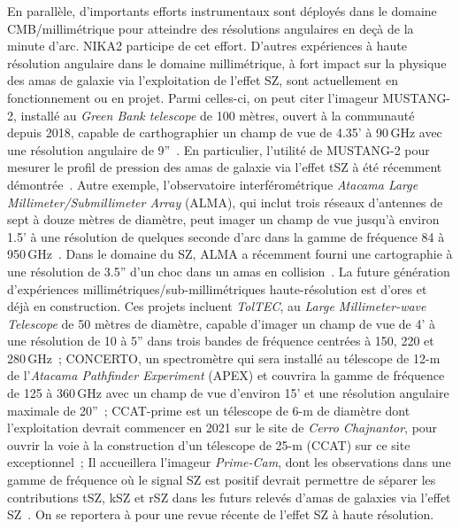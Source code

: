 En parallèle, d'importants efforts instrumentaux sont déployés dans le
domaine CMB/millimétrique pour atteindre des résolutions angulaires en
deçà de la minute d'arc. NIKA2 participe de cet effort. D'autres
expériences à haute résolution angulaire dans le domaine
millimétrique, à fort impact sur la physique des amas
de galaxie via l'exploitation de l'effet SZ, sont actuellement en
fonctionnement ou en projet. Parmi celles-ci, on peut citer l'imageur
MUSTANG-2, installé au \emph{Green Bank telescope} de 100 mètres,
ouvert à la communauté depuis 2018, capable de carthographier un champ
de vue de 4.35’ à 90\,GHz avec une résolution angulaire de
9''~\citep{Dicker2014_MUSTANG2, Stanchfield2016_MUSTANG2}. En
particulier, l'utilité de MUSTANG-2 pour mesurer le profil de
pression des amas de galaxie via l'effet tSZ à été récemment
démontrée~\citep{Romero2019_SZ}.
Autre exemple, l'observatoire interférométrique \emph{Atacama Large
  Millimeter/Submillimeter Array} (ALMA), qui inclut trois réseaux
d'antennes de sept à douze mètres de diamètre, peut imager un champ de
vue jusqu'à environ 1.5' à une résolution de quelques seconde d'arc
dans la gamme de fréquence 84 à 950\,GHz~\citep{ALMA2008, Iguchi2009}.
Dans le domaine du SZ, ALMA a récemment fourni une cartographie à une
résolution de 3.5'' d'un choc dans un amas en
collision~\citep{Basu2016}. La future génération d'expériences
millimétriques/sub-millimétriques haute-résolution est d'ores et déjà en
construction. Ces projets incluent \emph{TolTEC}, au
\emph{Large Millimeter-wave Telescope} de 50 mètres de diamètre,
capable d'imager un champ de vue de 4' à une résolution de 10 à 5''
dans trois bandes de fréquence centrées à 150, 220 et
280\,GHz~\citet{bryan_optical_2018}; CONCERTO, un spectromètre qui
sera installé au télescope de 12-m de l'\emph{Atacama Pathfinder
  Experiment} (APEX) et couvrira la gamme de
fréquence de 125 à 360\,GHz avec un champ de vue d'environ 15' et une
résolution angulaire maximale de 20''~\citep{Lagache2018}; 
CCAT-prime est un télescope de 6-m de diamètre dont l'exploitation
devrait commencer en 2021 sur le site de \emph{Cerro Chajnantor}, pour
ouvrir la voie à la construction d'un télescope de 25-m (CCAT) sur ce
site exceptionnel~\citep{Stacey2018}; Il accueillera l'imageur
\emph{Prime-Cam}, dont les observations dans une gamme de fréquence où
le signal SZ est positif devrait permettre de séparer les contributions
tSZ, kSZ et rSZ dans les futurs relevés d'amas de
galaxies via l'effet SZ~\citep{Mittal2018}. On se reportera à
\citet{Tony2019} pour une revue récente de l'effet SZ à haute
résolution.

